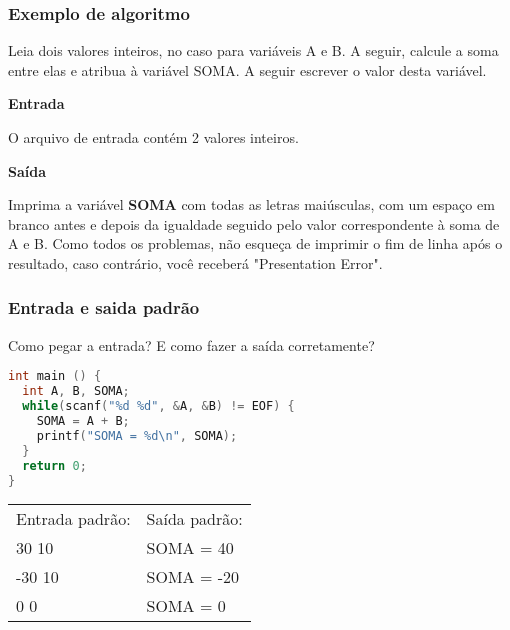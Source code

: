 \begin{frame}
  \frametitle{Exemplo de algoritmo}
    Leia dois valores inteiros, no caso para variáveis A e B. A seguir, calcule a soma entre elas e atribua à variável SOMA. A seguir escrever o valor desta variável.

  \begin{center}
    \textbf{Entrada}
  \end{center}
  O arquivo de entrada contém 2 valores inteiros.
  
  \begin{center}
    \textbf{Saída}
  \end{center}
  Imprima a variável \textbf{SOMA} com todas as letras maiúsculas, com um espaço em branco antes e depois da igualdade seguido pelo valor correspondente à soma de A e B. Como todos os problemas, não esqueça de imprimir o fim de linha após o resultado, caso contrário, você receberá "Presentation Error".
\end{frame}

\begin{frame}[fragile]
  \frametitle{Entrada e saida padrão}
  Como pegar a entrada? E como fazer a saída corretamente?
  \begin{lstlisting}[language=c]
int main () {
  int A, B, SOMA;
  while(scanf("%d %d", &A, &B) != EOF) {
    SOMA = A + B;
    printf("SOMA = %d\n", SOMA);
  }
  return 0;
}
  \end{lstlisting}
  \begin{tabular}{ll}\\
    Entrada padrão: &Saída padrão:\\
    30 10 &SOMA = 40\\
    -30 10 &SOMA = -20\\
    0 0 &SOMA = 0\\
  \end{tabular}
\end{frame}

